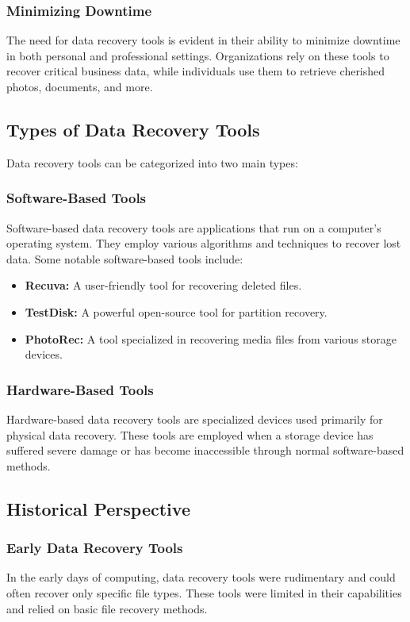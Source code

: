\documentclass[11pt]{article}
\begin{document}
\subsubsection{Minimizing Downtime}
The need for data recovery tools is evident in their ability to minimize downtime in both personal and professional settings. Organizations rely on these tools to recover critical business data, while individuals use them to retrieve cherished photos, documents, and more.

\subsection{Types of Data Recovery Tools}
Data recovery tools can be categorized into two main types:

\subsubsection{Software-Based Tools}
Software-based data recovery tools are applications that run on a computer's operating system. They employ various algorithms and techniques to recover lost data. Some notable software-based tools include:
\begin{itemize}
    \item \textbf{Recuva:} A user-friendly tool for recovering deleted files.
    \item \textbf{TestDisk:} A powerful open-source tool for partition recovery.
    \item \textbf{PhotoRec:} A tool specialized in recovering media files from various storage devices.
\end{itemize}

\subsubsection{Hardware-Based Tools}
Hardware-based data recovery tools are specialized devices used primarily for physical data recovery. These tools are employed when a storage device has suffered severe damage or has become inaccessible through normal software-based methods.

\subsection{Historical Perspective}
\subsubsection{Early Data Recovery Tools}
In the early days of computing, data recovery tools were rudimentary and could often recover only specific file types. These tools were limited in their capabilities and relied on basic file recovery methods.
\end{document}
